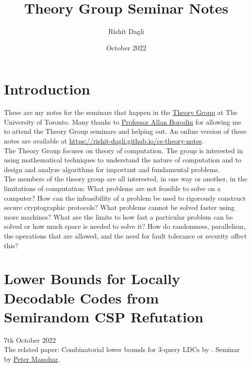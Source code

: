 \documentclass{article}
\title{Theory Group Seminar Notes}
\author{Rishit Dagli}
\date{October 2022}
\begin{document}
\maketitle

\tableofcontents
\clearpage

\section*{Introduction}

These are my notes for the seminars that happen in the \href{https://www.cs.toronto.edu/theory/}{Theory Group} at The University of Toronto. Many thanks to \href{http://www.cs.toronto.edu/~bor/}{Professor Allan Borodin} for allowing me to attend the Theory Group seminars and helping out. An online version of these notes are available at \url{https://rishit-dagli.github.io/cs-theory-notes}.\\

The Theory Group focuses on theory of computation. The group is interested in using mathematical techniques to understand the nature of computation and to design and analyze algorithms for important and fundamental problems.\\

The members of the theory group are all interested, in one way or another, in the limitations of computation: What problems are not feasible to solve on a computer? How can the infeasibility of a problem be used to rigorously construct secure cryptographic protocols? What problems cannot be solved faster using more machines? What are the limits to how fast a particular problem can be solved or how much space is needed to solve it? How do randomness, parallelism, the operations that are allowed, and the need for fault tolerance or security affect this?

\newpage

\section{Lower Bounds for Locally Decodable Codes from Semirandom CSP Refutation}

7th October 2022\\

\noindent The related paper: Combinatorial lower bounds for 3-query LDCs by \citet{Alrabiah2022-ds}. Seminar by \href{https://www.cs.cmu.edu/~pmanohar/}{Peter Manohar}. \cite{https://doi.org/10.48550/arxiv.1911.10698}
\end{document}
